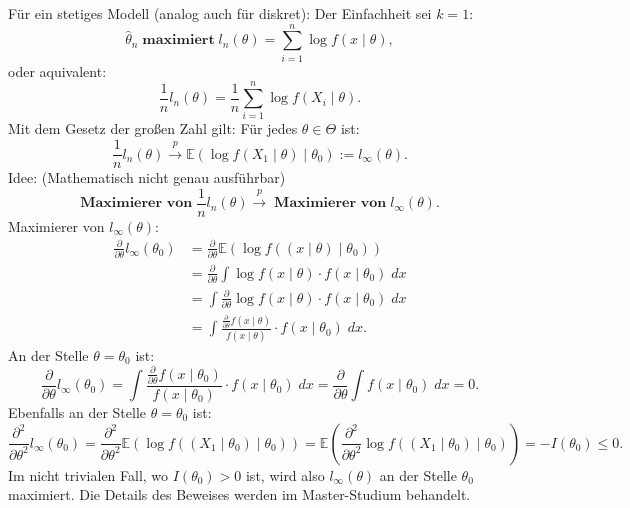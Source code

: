 \documentclass[10pt]{article}
\newcommand{\EW}{\mathbb{E}} %
\newcommand{\KW}{\overset{p} \longrightarrow} %
\newcommand{\xt}{x \mid \theta} %
\newenvironment{BWS}[1][]
{\begin{Beweis}[frametitle=#1]}{\end{Beweis}}
\begin{document}
	\begin{BWS}[Beweisidee 1.3.4 (Konsistenz von ML-Schätzern)]
		Für ein stetiges Modell (analog auch für diskret):
		Der Einfachheit sei $k=1$:
		\begin{equation*}
			\hat{\theta}_n \; \textbf{maximiert} \; l_n(\theta) = \sum_{i=1}^{n}\log f(\xt), 
		\end{equation*}
		oder aquivalent:
		\begin{equation*}
			\frac{1}{n} l_n(\theta) = \frac{1}{n}\sum_{i=1}^{n}\log f(X_i \mid \theta).
		\end{equation*}
		Mit dem Gesetz der großen Zahl gilt:
		Für jedes $\theta \in \Theta$ ist:
		\begin{equation*}
			\frac{1}{n} l_n (\theta) \KW \EW(\log f(X_1 \mid \theta) \mid \theta_0) := l_\infty (\theta).
		\end{equation*}
		Idee: (Mathematisch nicht genau ausführbar)
		\begin{equation*}
			\textbf{Maximierer von} \; \frac{1}{n} l_n(\theta) \KW \; \textbf{Maximierer von} \; l_\infty (\theta).
		\end{equation*}
		Maximierer von $l_\infty (\theta)$:
		\begin{equation*}
			\begin{split}
				\frac{\partial}{\partial \theta} l_\infty (\theta_0) &= \frac{\partial}{\partial \theta} \EW(\log f((x\mid \theta)\mid \theta_0))\\
				&= \frac{\partial}{\partial \theta} \int \log f(x \mid \theta) \cdot f(x \mid \theta_0) \; dx \\
				&= \int \frac{\partial}{\partial \theta} \log f(x \mid \theta) \cdot f(x\mid \theta_0) \; dx \\
				&=\int \frac{\frac{\partial}{\partial \theta} f(x\mid \theta)}{f(x\mid \theta)} \cdot f(x\mid \theta_0) \; dx. 
			\end{split}
		\end{equation*}
		An der Stelle $\theta = \theta_0$ ist:
		\begin{equation*}
			\frac{\partial}{\partial \theta} l_\infty (\theta_0) = \int \frac{\frac{\partial}{\partial \theta} f(x\mid\theta_0)}{f(x\mid\theta_0)} \cdot f(x\mid\theta_0) \; dx = \frac{\partial}{\partial \theta} \int f(x\mid\theta_0) \; dx = 0.
		\end{equation*}
		Ebenfalls an der Stelle $\theta = \theta_0$ ist:
		\begin{equation*}
			\frac{\partial^2}{\partial \theta^2} l_\infty(\theta_0) = \frac{\partial^2}{\partial \theta^2} \EW (\log f((X_1 \mid \theta_0) \mid \theta_0)) = \EW \left(\frac{\partial^2}{\partial \theta^2}\log f\left(\left(X_1 \mid \theta_0\right) \mid \theta_0\right)\right) = - I(\theta_0) \leq 0.
		\end{equation*}
		Im nicht trivialen Fall, wo $I(\theta_0) > 0$ ist, wird also $l_\infty (\theta)$ an der Stelle $\theta_0$ maximiert. Die Details des Beweises werden im Master-Studium behandelt. 
	\end{BWS}
	
\end{document}
